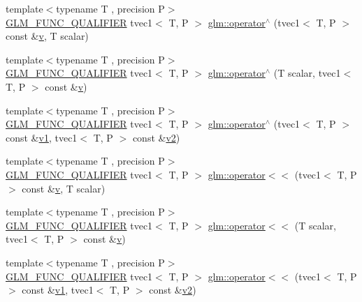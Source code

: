 \begin{DoxyCompactItemize}
\item 
{\footnotesize template$<$typename T , precision P$>$ }\\\mbox{\hyperlink{setup_8hpp_a33fdea6f91c5f834105f7415e2a64407}{G\+L\+M\+\_\+\+F\+U\+N\+C\+\_\+\+Q\+U\+A\+L\+I\+F\+I\+ER}} tvec1$<$ T, P $>$ \mbox{\hyperlink{namespaceglm_a82f1b8a608f9ef3e6212d6e4bfb10e88}{glm\+::operator$^\wedge$}} (tvec1$<$ T, P $>$ const \&\mbox{\hyperlink{glad_8h_a14cfbe2fc2234f5504618905b69d1e06}{v}}, T scalar)
\item 
{\footnotesize template$<$typename T , precision P$>$ }\\\mbox{\hyperlink{setup_8hpp_a33fdea6f91c5f834105f7415e2a64407}{G\+L\+M\+\_\+\+F\+U\+N\+C\+\_\+\+Q\+U\+A\+L\+I\+F\+I\+ER}} tvec1$<$ T, P $>$ \mbox{\hyperlink{namespaceglm_a0931409f5cbbda141a6faf01ac685107}{glm\+::operator$^\wedge$}} (T scalar, tvec1$<$ T, P $>$ const \&\mbox{\hyperlink{glad_8h_a14cfbe2fc2234f5504618905b69d1e06}{v}})
\item 
{\footnotesize template$<$typename T , precision P$>$ }\\\mbox{\hyperlink{setup_8hpp_a33fdea6f91c5f834105f7415e2a64407}{G\+L\+M\+\_\+\+F\+U\+N\+C\+\_\+\+Q\+U\+A\+L\+I\+F\+I\+ER}} tvec1$<$ T, P $>$ \mbox{\hyperlink{namespaceglm_ab1bd800c3747bf636e32a27e1200b811}{glm\+::operator$^\wedge$}} (tvec1$<$ T, P $>$ const \&\mbox{\hyperlink{glad_8h_a0779c3b73f9aa3a0ac5b0139b5d291d9}{v1}}, tvec1$<$ T, P $>$ const \&\mbox{\hyperlink{glad_8h_a9a09a1837922b2b806f4589096a52049}{v2}})
\item 
{\footnotesize template$<$typename T , precision P$>$ }\\\mbox{\hyperlink{setup_8hpp_a33fdea6f91c5f834105f7415e2a64407}{G\+L\+M\+\_\+\+F\+U\+N\+C\+\_\+\+Q\+U\+A\+L\+I\+F\+I\+ER}} tvec1$<$ T, P $>$ \mbox{\hyperlink{namespaceglm_ae28105c43b63f8ec8fbc37d828325fba}{glm\+::operator$<$$<$}} (tvec1$<$ T, P $>$ const \&\mbox{\hyperlink{glad_8h_a14cfbe2fc2234f5504618905b69d1e06}{v}}, T scalar)
\item 
{\footnotesize template$<$typename T , precision P$>$ }\\\mbox{\hyperlink{setup_8hpp_a33fdea6f91c5f834105f7415e2a64407}{G\+L\+M\+\_\+\+F\+U\+N\+C\+\_\+\+Q\+U\+A\+L\+I\+F\+I\+ER}} tvec1$<$ T, P $>$ \mbox{\hyperlink{namespaceglm_a6c50d543a5dd9b9d7376a469db9b939e}{glm\+::operator$<$$<$}} (T scalar, tvec1$<$ T, P $>$ const \&\mbox{\hyperlink{glad_8h_a14cfbe2fc2234f5504618905b69d1e06}{v}})
\item 
{\footnotesize template$<$typename T , precision P$>$ }\\\mbox{\hyperlink{setup_8hpp_a33fdea6f91c5f834105f7415e2a64407}{G\+L\+M\+\_\+\+F\+U\+N\+C\+\_\+\+Q\+U\+A\+L\+I\+F\+I\+ER}} tvec1$<$ T, P $>$ \mbox{\hyperlink{namespaceglm_a18bc5532629133c9f2073b928778cc5c}{glm\+::operator$<$$<$}} (tvec1$<$ T, P $>$ const \&\mbox{\hyperlink{glad_8h_a0779c3b73f9aa3a0ac5b0139b5d291d9}{v1}}, tvec1$<$ T, P $>$ const \&\mbox{\hyperlink{glad_8h_a9a09a1837922b2b806f4589096a52049}{v2}})

\end{DoxyCompactItemize}
